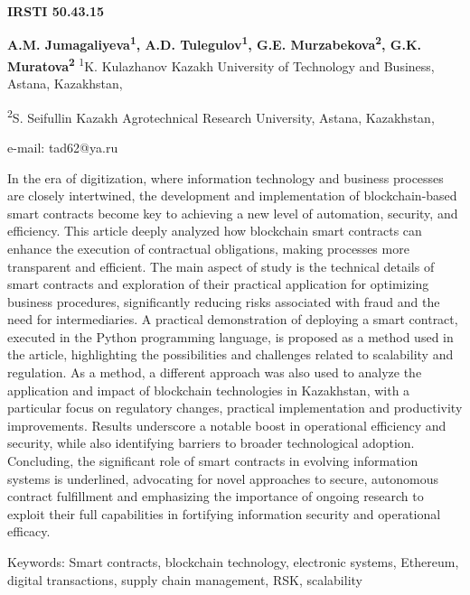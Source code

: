 \newpage
{\bfseries IRSTI 50.43.15}


\begin{center}
{\bfseries A.M. Jumagaliyeva\textsuperscript{1}, A.D. Tulegulov\textsuperscript{1}, G.E. Murzabekova\textsuperscript{2}, G.K. Muratova\textsuperscript{2}}
\textsuperscript{1}K. Kulazhanov Kazakh University of Technology and
Business, Astana, Kazakhstan,

\textsuperscript{2}S. Seifullin Kazakh Agrotechnical Research
University, Astana, Kazakhstan,

e-mail: tad62@ya.ru
\end{center}

In the era of digitization, where information technology and business
processes are closely intertwined, the development and implementation of
blockchain-based smart contracts become key to achieving a new level of
automation, security, and efficiency. This article deeply analyzed how
blockchain smart contracts can enhance the execution of contractual
obligations, making processes more transparent and efficient. The main
aspect of study is the technical details of smart contracts and
exploration of their practical application for optimizing business
procedures, significantly reducing risks associated with fraud and the
need for intermediaries. A practical demonstration of deploying a smart
contract, executed in the Python programming language, is proposed as a
method used in the article, highlighting the possibilities and
challenges related to scalability and regulation. As a method, a
different approach was also used to analyze the application and impact
of blockchain technologies in Kazakhstan, with a particular focus on
regulatory changes, practical implementation and productivity
improvements. Results underscore a notable boost in operational
efficiency and security, while also identifying barriers to broader
technological adoption. Concluding, the significant role of smart
contracts in evolving information systems is underlined, advocating for
novel approaches to secure, autonomous contract fulfillment and
emphasizing the importance of ongoing research to exploit their full
capabilities in fortifying information security and operational
efficacy.

Keywords: Smart contracts, blockchain technology, electronic systems,
Ethereum, digital transactions, supply chain management, RSK,
scalability

